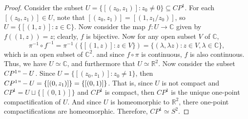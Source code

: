 \documentclass[12pt]{article}
\newcommand{\R}{\mathbb{R}}
\newcommand{\C}{\mathbb{C}}
\begin{document}
\begin{proof}
    Consider the subset $U=\{[(z_0,z_1)] : z_0\ne0\}\subseteq CP^1$. For each $[(z_0,z_1)]\in U$, note that $[(z_0,z_1)]=[(1,z_1/z_0)]$, so $U=\{[(1,z)] : z\in\C\}$. Now consider the map $f:U\to\C$ given by $f((1,z))=z$; clearly, $f$ is bijective. Now for any open subset $V$ of $\C$,
    \[\pi^{-1}\circ f^{-1} = \pi^{-1}(\{[(1,z)] : z\in V\}) = \{(\lambda, \lambda z) : z\in V, \lambda\in\C\},\]
    which is an open subset of $\C^2$. and since $f\circ \pi$ is continuous, $f$ is also continuous. Thus, we have $U\simeq\C$, and furthermore that $U\simeq\R^2$. Now consider the subset $CP^1"-U$. Since $U=\{[(z_0,z_1)] : z_0\ne 1\}$, then $CP^1"-U=\{[(0,z_1)]\}=\{[(0,1)]\}$. That is, since $U$ is not compact and $CP^1=U\sqcup\{[(0,1)]\}$ and $CP^1$ is compact, then $CP^1$ is the unique one-point compactification of $U$. And since $U$ is homeomorphic to $\R^2$, there one-point compactifications are homeomorphic. Therefore, $CP^1\simeq S^2$.
    
\end{proof}
\end{document}
